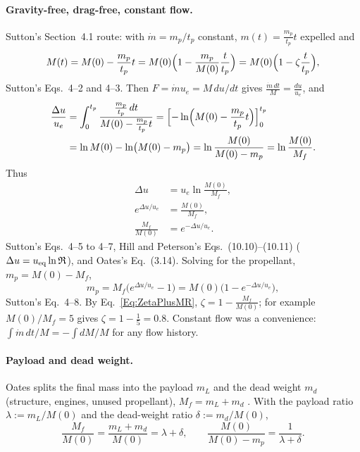 \paragraph{Gravity-free, drag-free, constant flow.} Sutton's Section~4.1
route: with $\dot m=m_p/t_p$ constant, $m(t)=\frac{m_p}{t_p}t$ expelled and
\[
 M(t)=M(0)-\frac{m_p}{t_p}t
 =M(0)\Bigl(1-\frac{m_p}{M(0)}\frac{t}{t_p}\Bigr)
 =M(0)\Bigl(1-\zeta\frac{t}{t_p}\Bigr),
\]
Sutton's Eqs.~4--2 and 4--3. Then $F=\dot mu_e=M\,du/dt$ gives
$\frac{\dot m\,dt}{M}=\frac{du}{u_e}$, and
\[
\begin{aligned}
 \frac{\Delta u}{u_e}
 &=\int_0^{t_p}\frac{\frac{m_p}{t_p}\,dt}{M(0)-\frac{m_p}{t_p}t}
 =\Bigl[-\ln\Bigl(M(0)-\frac{m_p}{t_p}t\Bigr)\Bigr]_0^{t_p}\\
 &=\ln M(0)-\ln\bigl(M(0)-m_p\bigr)
 =\ln\frac{M(0)}{M(0)-m_p}=\ln\frac{M(0)}{M_f}.
\end{aligned}
\]
Thus
\begin{equation}\label{eq:va-ideal}
\begin{aligned}
 \Delta u&=u_e\ln\frac{M(0)}{M_f},\\
 e^{\Delta u/u_e}&=\frac{M(0)}{M_f},\\
 \frac{M_f}{M(0)}&=e^{-\Delta u/u_e}.
\end{aligned}
\end{equation}
Sutton's Eqs.~4--5 to 4--7, Hill and Peterson's Eqs.~(10.10)--(10.11)
($\Delta u=u_{\rm eq}\ln\mathfrak R$), and Oates's Eq.~(3.14). Solving for
the propellant, $m_p=M(0)-M_f$,
\begin{equation}\label{eq:va-propellant}
 m_p=M_f\bigl(e^{\Delta u/u_e}-1\bigr)=M(0)\bigl(1-e^{-\Delta u/u_e}\bigr),
\end{equation}
Sutton's Eq.~4--8. By Eq.~\ref{Eq:ZetaPlusMR}, $\zeta=1-\frac{M_f}{M(0)}$; for
example $M(0)/M_f=5$ gives $\zeta=1-\frac15=0.8$. Constant flow was a
convenience: $\int\dot m\,dt/M=-\int dM/M$ for any flow history.

\paragraph{Payload and dead weight.} Oates splits the final mass into the
payload $m_L$ and the dead weight $m_d$ (structure, engines, unused
propellant), $M_f=m_L+m_d$ \cite[p.~67]{oates}. With the payload ratio
$\lambda:=m_L/M(0)$ and the dead-weight ratio $\delta:=m_d/M(0)$,
\[
 \frac{M_f}{M(0)}=\frac{m_L+m_d}{M(0)}=\lambda+\delta,
 \qquad
 \frac{M(0)}{M(0)-m_p}=\frac1{\lambda+\delta}.
\]

